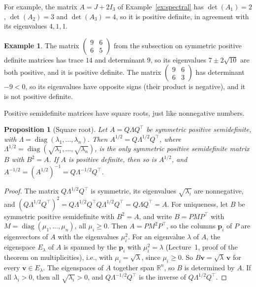 \documentclass[11pt]{article}
\theoremstyle{definition}
\newtheorem{example}[definition]{Example}
\theoremstyle{plain}
\newtheorem{proposition}[definition]{Proposition}
\theoremstyle{remark}
\DeclareMathOperator{\diag}{diag}
\begin{document}
For example, the matrix $A = J + 2I_3$ of Example~\ref{ex:spectral} has $\det(A_1) = 2$, $\det(A_2) = 3$ and $\det(A_3) = 4$, so it is positive definite, in agreement with its eigenvalues $4, 1, 1$.

\begin{example}
    The matrix $\begin{pmatrix} 9 & 6 \\ 6 & 5 \end{pmatrix}$ from the subsection on symmetric positive definite matrices has trace $14$ and determinant $9$, so its eigenvalues $7 \pm 2\sqrt{10}$ are both positive, and it is positive definite. The matrix $\begin{pmatrix} 9 & 6 \\ 6 & 3 \end{pmatrix}$ has determinant $-9 < 0$, so its eigenvalues have opposite signs (their product is negative), and it is not positive definite.
\end{example}

Positive semidefinite matrices have square roots, just like nonnegative numbers.

\begin{proposition}[Square root]\label{prop:sqrt}
    Let $A = Q\Lambda Q^\top$ be symmetric positive semidefinite, with $\Lambda = \diag(\lambda_1, \ldots, \lambda_n)$. Then $A^{1/2} = Q\Lambda^{1/2}Q^\top$, where $\Lambda^{1/2} = \diag(\sqrt{\lambda_1}, \ldots, \sqrt{\lambda_n})$, is the only symmetric positive semidefinite matrix $B$ with $B^2 = A$. If $A$ is positive definite, then so is $A^{1/2}$, and $A^{-1/2} = (A^{1/2})^{-1} = Q\Lambda^{-1/2}Q^\top$.
\end{proposition}

\begin{proof}
    The matrix $Q\Lambda^{1/2}Q^\top$ is symmetric, its eigenvalues $\sqrt{\lambda_i}$ are nonnegative, and $(Q\Lambda^{1/2}Q^\top)^2 = Q\Lambda^{1/2}Q^\top Q\Lambda^{1/2}Q^\top = Q\Lambda Q^\top = A$. For uniqueness, let $B$ be symmetric positive semidefinite with $B^2 = A$, and write $B = PMP^\top$ with $M = \diag(\mu_1, \ldots, \mu_n)$, all $\mu_i \geq 0$. Then $A = PM^2P^\top$, so the columns $\mathbf{p}_i$ of $P$ are eigenvectors of $A$ with the eigenvalues $\mu_i^2$. For an eigenvalue $\lambda$ of $A$, the eigenspace $E_\lambda$ of $A$ is spanned by the $\mathbf{p}_i$ with $\mu_i^2 = \lambda$ (Lecture~1, proof of the theorem on multiplicities), i.e., with $\mu_i = \sqrt{\lambda}$, since $\mu_i \geq 0$. So $B\mathbf{v} = \sqrt{\lambda}\,\mathbf{v}$ for every $\mathbf{v} \in E_\lambda$. The eigenspaces of $A$ together span $\mathbb{R}^n$, so $B$ is determined by $A$. If all $\lambda_i > 0$, then all $\sqrt{\lambda_i} > 0$, and $Q\Lambda^{-1/2}Q^\top$ is the inverse of $Q\Lambda^{1/2}Q^\top$.
\end{proof}
\end{document}
